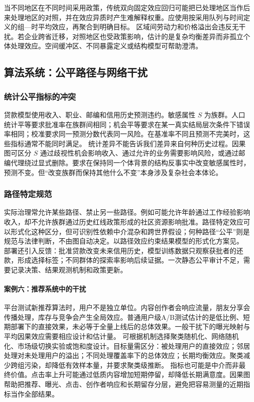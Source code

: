 当不同地区在不同时间采用政策，传统双向固定效应回归可能把已处理地区当作后来处理地区的对照，并在效应异质时产生难解释权重。应使用按采用队列与时间定义的组---时平均效应，再聚合到明确目标\parencite{callawaysantanna2021,sunabraham2021}。
区域间劳动力和价格溢出会违反无干扰。若企业跨省迁移，对照地区也受政策影响，估计的是复杂均衡差异而非孤立个体处理效应。空间缓冲区、不同暴露定义或结构模型可帮助澄清。

\subsection{算法系统：公平路径与网络干扰}

\subsubsection{统计公平指标的冲突}

贷款模型使用收入、职业、邮编和信用历史预测违约。敏感属性 $S$ 为族群。人口统计平等要求批准率在族群间相同；机会平等要求在某一真实结局层次条件下错误率相同；校准要求同一预测分数代表同一风险。在基准率不同且预测不完美时，这些指标通常不能同时满足。
统计差异不能告诉我们差异来自何种历史过程。因果图可区分 $S$ 通过歧视性机会影响收入、通过允许的业务需要影响风险，或通过邮编代理绕过显式删除。要求在保持同一个体背景的结构反事实中改变敏感属性时，预测不变\parencite{kusner2017}。但“改变族群而保持其他什么不变”本身涉及复杂社会本体论。

\subsubsection{路径特定规范}

实际治理常允许某些路径、禁止另一些路径。例如可能允许年龄通过工作经验影响收入，却不允许族群通过历史红线政策形成的社区资源影响批准。路径特定效应可以形式化这种区分，但可识别性依赖中介混杂和跨世界假设；何种路径“公平”则是规范与法律判断，不由图自动决定。以路径效应约束结果模型的形式化方案见\textcite{nabishpitser2018}。
部署还引入反馈：批准贷款改变未来信用历史，模型训练数据只观察获批者的还款，形成选择标签；不同群体的探索率影响后续证据。一次静态公平审计不足，需要记录决策、结果观测机制和政策更新。

\paragraph{案例六：推荐系统中的干扰}

平台测试新推荐算法时，用户不是独立单位。内容创作者会响应流量，朋友分享会传播处理，库存与竞争会产生全局效应。普通用户级A/B测试估计的是低比例、短期部署下的直接效果，未必等于全量上线后的总体效果。一般干扰下的曝光映射与平均因果效应需要相应设计和估计量\parencite{aronowsamii2017}。
可根据机制选择聚类随机化、网络随机化、市场级切换实验或饱和度设计。目标量需区分：被处理用户的直接效应；邻居处理对未处理用户的溢出；不同处理覆盖率下的总体效应；长期均衡效应。聚类减少跨组污染，却降低有效样本量，并要求聚类级推断。
指标也可能是中介而非最终价值。点击率上升可能通过低质内容增加短期停留，却降低长期满意度。因果图帮助把推荐、曝光、点击、创作者响应和长期留存分层，避免把容易测量的近期指标当作全部结果。

